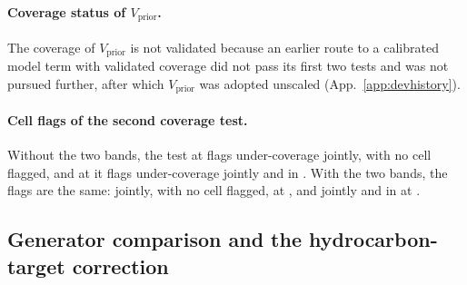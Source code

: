 \paragraph{Coverage status of $V_{\mathrm{prior}}$.} The coverage of $V_{\mathrm{prior}}$ is not validated because an earlier route to a calibrated model term with validated coverage did not pass its first two tests and was not pursued further, after which $V_{\mathrm{prior}}$ was adopted unscaled (App.~\ref{app:devhistory}).

\paragraph{Cell flags of the second coverage test.} Without the two bands, the test at  flags under-coverage jointly, with no cell flagged, and at  it flags under-coverage jointly and in . With the two bands, the flags are the same: jointly, with no cell flagged, at , and jointly and in  at .

\subsection{Generator comparison and the hydrocarbon-target correction}\label{recsec:sixteen-generators}

